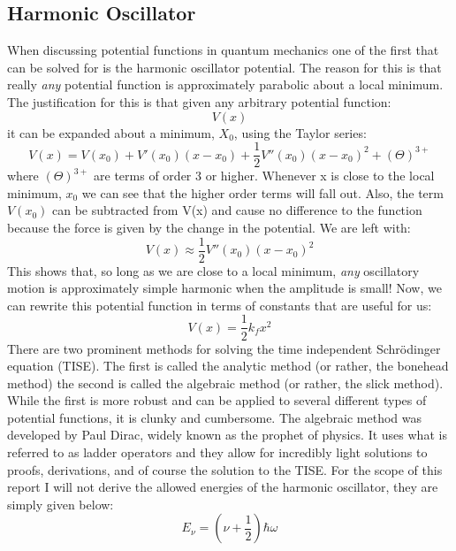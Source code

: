 \documentclass[letterpaper,12pt]{article}
\begin{document}
\subsection{Harmonic Oscillator}
When discussing potential functions in quantum mechanics one of the first that can be solved for is the harmonic oscillator potential. The reason for this is that really \textit{any} potential function is approximately parabolic about a local minimum. The justification for this is that given any arbitrary potential function:
\begin{equation}
    V(x)
\end{equation}
it can be expanded about a minimum, $X_0$, using the Taylor series:
\begin{equation}
    V(x)=V(x_0)+V'(x_0)(x-x_0)+\frac{1}{2}V''(x_0)(x-x_0)^2+(\Theta)^{3+}
\end{equation}
where $(\Theta)^{3+}$ are terms of order 3 or higher. Whenever x is close to the local minimum, $x_0$ we can see that the higher order terms will fall out. Also, the term $V(x_0)$ can be subtracted from V(x) and cause no difference to the function because the force is given by the change in the potential. We are left with:
\begin{equation}
    V(x)\approx\frac{1}{2}V''(x_0)(x-x_0)^2
\end{equation}
This shows that, so long as we are close to a local minimum, \textit{any} oscillatory motion is approximately simple harmonic when the amplitude is small!\newline
Now, we can rewrite this potential function in terms of constants that are useful for us:
\begin{equation}
    V(x)=\frac{1}{2}k_fx^2
\end{equation}
There are two prominent methods for solving the time independent Schr\"{o}dinger equation (TISE). The first is called the analytic method (or rather, the bonehead method) the second is called the algebraic method (or rather, the slick method). While the first is more robust and can be applied to several different types of potential functions, it is clunky and cumbersome. The algebraic method was developed by Paul Dirac, widely known as the prophet of physics. It uses what is referred to as ladder operators and they allow for incredibly light solutions to proofs, derivations, and of course the solution to the TISE. For the scope of this report I will not derive the allowed energies of the harmonic oscillator, they are simply given below:
\begin{equation}
    E_\nu=(\nu+\frac{1}{2})\hbar\omega
\end{equation}
\end{document}

